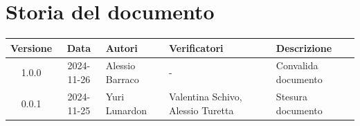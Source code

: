 \section*{Storia del documento}
\begin{tabularx}{\textwidth}{ c c p{3cm} p{3.17cm} X }
    \rowcolor{gray!20}\rule{0pt}{0.5cm}\textbf{Versione} & \textbf{Data} & \textbf{Autori} & \textbf{Verificatori} & \textbf{Descrizione} \\[0.7ex]
    \hline
    \rule{0pt}{0.5cm}1.0.0 & 2024-11-26 & Alessio Barraco & - & Convalida documento\\[3.5ex]
    \hline
    \rule{0pt}{0.5cm}0.0.1 & 2024-11-25 & Yuri Lunardon & Valentina Schivo, \newline Alessio Turetta & Stesura documento\\[0.7ex] 
\end{tabularx}

